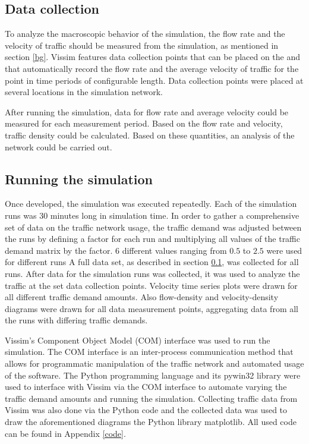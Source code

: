 \documentclass[english, 12pt, a4paper, elec, utf8, pdfa, online]{aaltothesis}
\begin{document}
\subsection{Data collection} \label{data}

To analyze the macroscopic behavior of the simulation, the flow rate and the velocity of traffic should be measured from the simulation, as mentioned in section \ref{bg}. Vissim features data collection points that can be placed on the and that automatically record the flow rate and the average velocity of traffic for the point in time periods of configurable length. Data collection points were placed at several locations in the simulation network. 

After running the simulation, data for flow rate and average velocity could be measured for each measurement period. Based on the flow rate and velocity, traffic density could be calculated. Based on these quantities, an analysis of the network could be carried out.

\subsection{Running the simulation}

Once developed, the simulation was executed repeatedly. Each of the simulation runs was 30 minutes long in simulation time. In order to gather a comprehensive set of data on the traffic network usage, the traffic demand was adjusted between the runs by defining a factor for each run and multiplying all values of the traffic demand matrix by the factor. 6 different values ranging from $0.5$ to $2.5$ were used for different runs A full data set, as described in section \ref{data}, was collected for all runs. After data for the simulation runs was collected, it was used to analyze the traffic at the set data collection points. Velocity time series plots were drawn for all different traffic demand amounts. Also flow-density and velocity-density diagrams were drawn for all data measurement points, aggregating data from all the runs with differing traffic demands.

Vissim's Component Object Model (COM) interface was used to run the simulation. The COM interface is an inter-process communication method that allows for programmatic manipulation of the traffic network and automated usage of the software. The Python programming language and its pywin32 library were used to interface with Vissim via the COM interface to automate varying the traffic demand amounts and running the simulation. Collecting traffic data from Vissim was also done via the Python code and the collected data was used to draw the aforementioned diagrams the Python library matplotlib. All used code can be found in Appendix \ref{code}.
\end{document}
